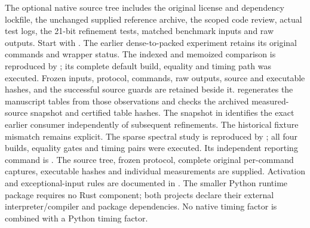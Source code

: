 \documentclass[11pt,a4paper]{article}
\theoremstyle{definition}\newtheorem{definition}[theorem]{Definition}
\begin{document}
The optional native source tree includes the original license and dependency lockfile, the unchanged supplied reference archive, the scoped code review, actual test logs, the 21-bit refinement tests, matched benchmark inputs and raw outputs. Start with . The earlier dense-to-packed experiment retains its original commands and wrapper status. The indexed and memoized comparison is reproduced by ; its complete default build, equality and timing path was executed. Frozen inputs, protocol, commands, raw outputs, source and executable hashes, and the successful source guards are retained beside it.  regenerates the manuscript tables from those observations and checks the archived measured-source snapshot and certified table hashes. The snapshot in  identifies the exact earlier consumer independently of subsequent refinements. The historical fixture mismatch remains explicit. The sparse spectral study is reproduced by ; all four builds, equality gates and timing pairs were executed. Its independent reporting command is . The source tree, frozen protocol, complete original per-command captures, executable hashes and individual measurements are supplied. Activation and exceptional-input rules are documented in . The smaller Python runtime package requires no Rust component; both projects declare their external interpreter/compiler and package dependencies. No native timing factor is combined with a Python timing factor.

\bigskip
\begingroup
\small
\setlength{\bibsep}{5pt plus 1pt minus 1pt}
\raggedright
{}



\endgroup
\end{document}
